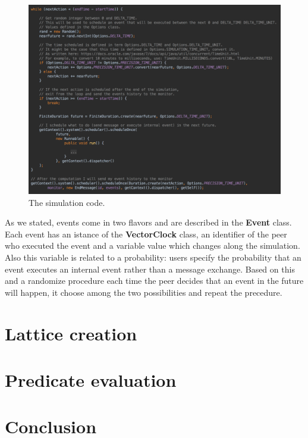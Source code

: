 \documentclass[11pt]{article}
\begin{document}
\begin{figure}[!ht]
\includegraphics[width=\textwidth]{scheduler}
\caption{The simulation code.}
\label{fig:scheduler}
\end{figure}

\noindent
As we stated, events come in two flavors and are described in the \textbf{Event} class. Each event has an istance of the \textbf{VectorClock} class, an identifier of the peer who executed the event and a variable value which changes along the simulation. Also this variable is related to a probability: users specify the probability that an event executes an internal event rather than a message exchange. Based on this and a randomize procedure each time the peer decides that an event in the future will happen, it choose among the two possibilities and repeat the precedure.

\section{Lattice creation}

\section{Predicate evaluation}

\section{Conclusion}



\end{document}

